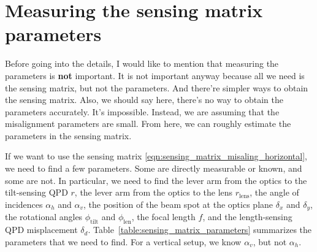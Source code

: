 \section{Measuring the sensing matrix parameters\label{sec:measuring_the_sensing_matrix_parameters}}
Before going into the details, I would like to mention that measuring the parameters is \textbf{not} important.
It is not important anyway because all we need is the sensing matrix, but not the parameters.
And there're simpler ways to obtain the sensing matrix.
Also, we should say here, there's no way to obtain the parameters accurately.
It's impossible.
Instead, we are assuming that the misalignment parameters are small.
From here, we can roughly estimate the parameters in the sensing matrix.

If we want to use the sensing matrix \eqref{eqn:sensing_matrix_misaling_horizontal}, we need to find a few parameters.
Some are directly measurable or known, and some are not.
In particular, we need to find the lever arm from the optics to the tilt-sensing QPD $r$, the lever arm from the optics to the lens $r_\mathrm{lens}$, the angle of incidences $\alpha_h$ and $\alpha_v$, the position of the beam spot at the optics plane $\delta_x$ and $\delta_y$, the rotational angles $\phi_\mathrm{tilt}$ and $\phi_\mathrm{len}$, the focal length $f$, and the length-sensing QPD misplacement $\delta_d$.
Table~\ref{table:sensing_matrix_parameters} summarizes the parameters that we need to find. For a vertical setup, we know $\alpha_v$, but not $\alpha_h$.

